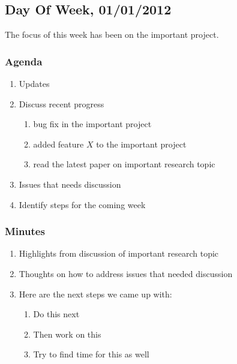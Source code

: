 \subsection{Day Of Week, 01/01/2012}

The focus of this week has been on the important project.

\subsubsection{Agenda}

\begin{enumerate}

    \item Updates

    \item Discuss recent progress

        \begin{enumerate}

            \item bug fix in the important project

            \item added feature $X$ to the important project

            \item read the latest paper on important research topic

        \end{enumerate}

    \item Issues that needs discussion

    \item Identify steps for the coming week

\end{enumerate}

\subsubsection{Minutes}

\begin{enumerate}

    \item Highlights from discussion of important research topic

    \item Thoughts on how to address issues that needed discussion

    \item Here are the next steps we came up with:

        \begin{enumerate}

            \item Do this next

            \item Then work on this

            \item Try to find time for this as well

        \end{enumerate}

\end{enumerate}

